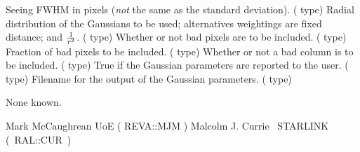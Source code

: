 {\begin{manroutinedescription}
\begin{manparametertable}
  Seeing FWHM in pixels ({\em not} the same as the standard
  deviation). ({} type)
  Radial distribution of the Gaussians to be used; alternatives
  weightings are {} {\mantt{=}} fixed distance; and
  {} {\mantt{=}} {${1\over r^2}$}. ({} type)
  \mbox{\mantt ['FIX']}
  Whether or not bad pixels are to be included.  ({} type)
  \mbox{\mantt [FALSE]}
  Fraction of bad pixels to be included. ({} type)
  \mbox{\mantt [0.01]}
  Whether or not a bad column is to be included. ({} type)
  \mbox{\mantt [FALSE]}
  True if the Gaussian parameters are reported to the user. ({} type)
  \mbox{\mantt [FALSE]}
  Filename for the output of the Gaussian parameters.  ({} type)
  \mbox{\mantt [!]}
\end{manparametertable}
  None known.

  Mark McCaughrean UoE ( {\mantt REVA}::{\mantt MJM} )
  Malcolm J. Currie ~STARLINK \mbox{( {\mantt RAL}::{\mantt CUR} )}
\end{manroutinedescription}

}
